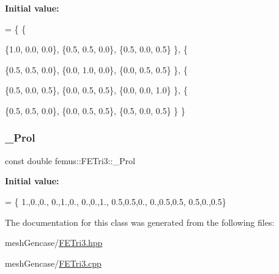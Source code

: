 {\bfseries Initial value\+:}
\begin{DoxyCode}
=
\{ 
  \{
    
    \{1.0, 0.0, 0.0\}, 
    \{0.5, 0.5, 0.0\}, 
    \{0.5, 0.0, 0.5\}  
  \},
  \{
    
    \{0.5, 0.5, 0.0\}, 
    \{0.0, 1.0, 0.0\}, 
    \{0.0, 0.5, 0.5\}  
  \},
  \{ 
    
    \{0.5, 0.0, 0.5\}, 
    \{0.0, 0.5, 0.5\}, 
    \{0.0, 0.0, 1.0\}  
  \},
  \{ 
    
    \{0.5, 0.5, 0.0\}, 
    \{0.0, 0.5, 0.5\}, 
    \{0.5, 0.0, 0.5\}  
  \}
\}
\end{DoxyCode}
\mbox{\label{classfemus_1_1_f_e_tri3_aef865243ebec6c1da8594e2e74da72e0}} 
\subsubsection{\texorpdfstring{\+\_\+\+Prol}{\_Prol}}
{\footnotesize\ttfamily const double femus\+::\+F\+E\+Tri3\+::\+\_\+\+Prol\hspace{0.3cm}{\ttfamily [static]}}

{\bfseries Initial value\+:}
\begin{DoxyCode}
= \{ 
   1.,0.,0.,
   0.,1.,0.,
   0.,0.,1.,
   0.5,0.5,0.,
   0.,0.5,0.5,
   0.5,0.,0.5\}
\end{DoxyCode}


The documentation for this class was generated from the following files\+:\begin{DoxyCompactItemize}
\item 
mesh\+Gencase/\mbox{\hyperlink{_f_e_tri3_8hpp}{F\+E\+Tri3.\+hpp}}\item 
mesh\+Gencase/\mbox{\hyperlink{_f_e_tri3_8cpp}{F\+E\+Tri3.\+cpp}}\end{DoxyCompactItemize}
